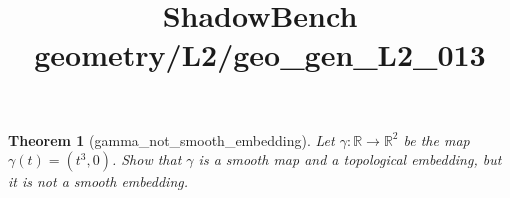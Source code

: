 \documentclass{article}
\title{ShadowBench geometry/L2/geo\_gen\_L2\_013}
\newtheorem{theorem}{Theorem}
\begin{document}
\maketitle

\begin{theorem}[gamma_not_smooth_embedding]
Let $\gamma: \mathbb{R} \to \mathbb{R}^2$ be the map $\gamma(t) = (t^3, 0)$. Show that $\gamma$ is a smooth map and a topological embedding, but it is not a smooth embedding.
\end{theorem}
\end{document}
